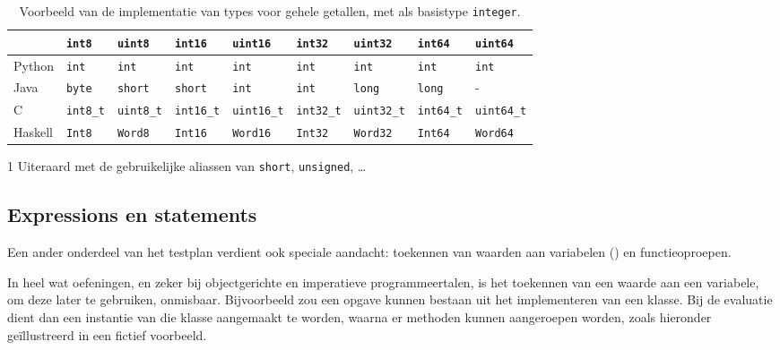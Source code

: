 \begin{table}
    \centering
    \caption{Voorbeeld van de implementatie van types voor gehele getallen, met als basistype \texttt{integer}.}
    \label{tab:vertaling}
    \begin{threeparttable}
        \begin{tabular}{|l|llllllll|}
            \hline
                       & \texttt{int8} & \texttt{uint8} & \texttt{int16} & \texttt{uint16} & \texttt{int32} & \texttt{uint32} & \texttt{int64} & \texttt{uint64} \\
            \hline
            Python     & \texttt{int}  & \texttt{int}   & \texttt{int}   & \texttt{int}    & \texttt{int}   & \texttt{int}    & \texttt{int}   & \texttt{int}    \\
            Java       & \texttt{byte} & \texttt{short} & \texttt{short} & \texttt{int}    & \texttt{int}   & \texttt{long}   & \texttt{long}  & -               \\
            C\tnote{1} & \texttt{int8\_t} & \texttt{uint8\_t} & \texttt{int16\_t} & \texttt{uint16\_t} & \texttt{int32\_t} & \texttt{uint32\_t} & \texttt{int64\_t} & \texttt{uint64\_t} \\
            Haskell    & \texttt{Int8} & \texttt{Word8} & \texttt{Int16} & \texttt{Word16} & \texttt{Int32} & \texttt{Word32} & \texttt{Int64} & \texttt{Word64} \\
            \hline
        \end{tabular}
    \begin{tablenotes}
        \item[1] Uiteraard met de gebruikelijke aliassen van \texttt{short}, \texttt{unsigned}, \ldots
    \end{tablenotes}
    \end{threeparttable}
\end{table}

\subsection{Expressions en statements}\label{subsec:expressions-and-statements}

Een ander onderdeel van het testplan verdient ook speciale aandacht: toekennen van waarden aan variabelen () en functieoproepen.

In heel wat oefeningen, en zeker bij objectgerichte en imperatieve programmeertalen, is het toekennen van een waarde aan een variabele, om deze later te gebruiken, onmisbaar.
Bijvoorbeeld zou een opgave kunnen bestaan uit het implementeren van een klasse.
Bij de evaluatie dient dan een instantie van die klasse aangemaakt te worden, waarna er methoden kunnen aangeroepen worden, zoals hieronder geïllustreerd in een fictief voorbeeld.

